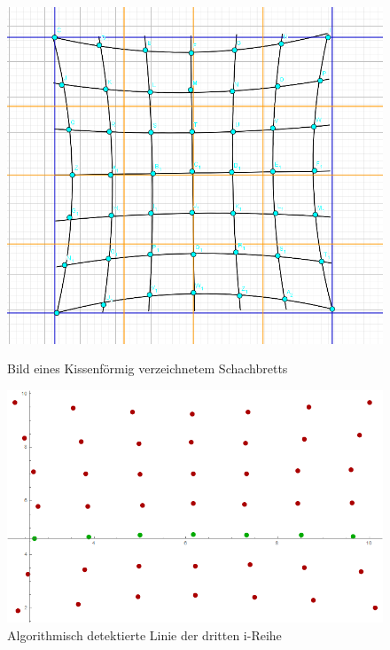 %

\begin{figure}[!htb]
	\includegraphics[width=\linewidth]{images/KissenVerzeichnung.png}
	\caption{Bild eines Kissenförmig verzeichnetem Schachbretts}
	\label{fig:awesome_image1}
	\endminipage\hfill
	\includegraphics[width=\linewidth]{images/AlgKissen.png}
	\caption{Algorithmisch detektierte Linie der dritten i-Reihe}
	\label{fig:awesome_image2}
	\endminipage\hfill
\end{figure}

